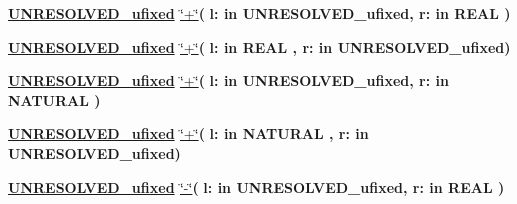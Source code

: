 \begin{DoxyCompactItemize}
\item 
{\bfseries {\bfseries {\bfseries \hyperlink{classfixed__pkg_ae78bc2b36d22f6abeac163955e8a587d}{U\+N\+R\+E\+S\+O\+L\+V\+E\+D\+\_\+ufixed}} \textcolor{vhdlchar}{ }}} \hyperlink{classfixed__pkg_aa622ccc4cb69ba73b8e7f9a8cfe42788}{\char`\"{}+\char`\"{}}{\bfseries  ( }{\bfseries \textcolor{vhdlchar}{l\+: }\textcolor{stringliteral}{in }\textcolor{vhdlchar}{U\+N\+R\+E\+S\+O\+L\+V\+E\+D\+\_\+ufixed}}{\bfseries  , \textcolor{vhdlchar}{r\+: }\textcolor{stringliteral}{in }{\bfseries \textcolor{comment}{R\+E\+A\+L}\textcolor{vhdlchar}{ }}}{\bfseries  )} 
\item 
{\bfseries {\bfseries {\bfseries \hyperlink{classfixed__pkg_ae78bc2b36d22f6abeac163955e8a587d}{U\+N\+R\+E\+S\+O\+L\+V\+E\+D\+\_\+ufixed}} \textcolor{vhdlchar}{ }}} \hyperlink{classfixed__pkg_aa622ccc4cb69ba73b8e7f9a8cfe42788}{\char`\"{}+\char`\"{}}{\bfseries  ( }{\bfseries \textcolor{vhdlchar}{l\+: }\textcolor{stringliteral}{in }{\bfseries \textcolor{comment}{R\+E\+A\+L}\textcolor{vhdlchar}{ }}}{\bfseries  , \textcolor{vhdlchar}{r\+: }\textcolor{stringliteral}{in }\textcolor{vhdlchar}{U\+N\+R\+E\+S\+O\+L\+V\+E\+D\+\_\+ufixed}}{\bfseries  )} 
\item 
{\bfseries {\bfseries {\bfseries \hyperlink{classfixed__pkg_ae78bc2b36d22f6abeac163955e8a587d}{U\+N\+R\+E\+S\+O\+L\+V\+E\+D\+\_\+ufixed}} \textcolor{vhdlchar}{ }}} \hyperlink{classfixed__pkg_aa622ccc4cb69ba73b8e7f9a8cfe42788}{\char`\"{}+\char`\"{}}{\bfseries  ( }{\bfseries \textcolor{vhdlchar}{l\+: }\textcolor{stringliteral}{in }\textcolor{vhdlchar}{U\+N\+R\+E\+S\+O\+L\+V\+E\+D\+\_\+ufixed}}{\bfseries  , \textcolor{vhdlchar}{r\+: }\textcolor{stringliteral}{in }{\bfseries \textcolor{comment}{N\+A\+T\+U\+R\+A\+L}\textcolor{vhdlchar}{ }}}{\bfseries  )} 
\item 
{\bfseries {\bfseries {\bfseries \hyperlink{classfixed__pkg_ae78bc2b36d22f6abeac163955e8a587d}{U\+N\+R\+E\+S\+O\+L\+V\+E\+D\+\_\+ufixed}} \textcolor{vhdlchar}{ }}} \hyperlink{classfixed__pkg_aa622ccc4cb69ba73b8e7f9a8cfe42788}{\char`\"{}+\char`\"{}}{\bfseries  ( }{\bfseries \textcolor{vhdlchar}{l\+: }\textcolor{stringliteral}{in }{\bfseries \textcolor{comment}{N\+A\+T\+U\+R\+A\+L}\textcolor{vhdlchar}{ }}}{\bfseries  , \textcolor{vhdlchar}{r\+: }\textcolor{stringliteral}{in }\textcolor{vhdlchar}{U\+N\+R\+E\+S\+O\+L\+V\+E\+D\+\_\+ufixed}}{\bfseries  )} 
\item 
{\bfseries {\bfseries {\bfseries \hyperlink{classfixed__pkg_ae78bc2b36d22f6abeac163955e8a587d}{U\+N\+R\+E\+S\+O\+L\+V\+E\+D\+\_\+ufixed}} \textcolor{vhdlchar}{ }}} \hyperlink{classfixed__pkg_a39970596105025f91b3839479d54d447}{\char`\"{}-\/\char`\"{}}{\bfseries  ( }{\bfseries \textcolor{vhdlchar}{l\+: }\textcolor{stringliteral}{in }\textcolor{vhdlchar}{U\+N\+R\+E\+S\+O\+L\+V\+E\+D\+\_\+ufixed}}{\bfseries  , \textcolor{vhdlchar}{r\+: }\textcolor{stringliteral}{in }{\bfseries \textcolor{comment}{R\+E\+A\+L}\textcolor{vhdlchar}{ }}}{\bfseries  )} 

\end{DoxyCompactItemize}
